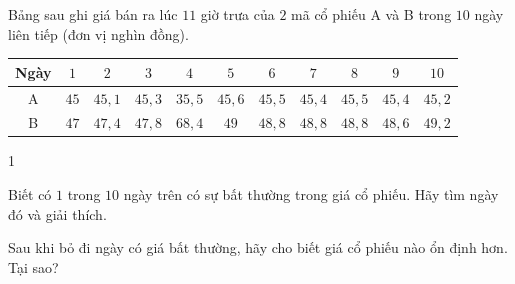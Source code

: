 \begin{bt}%
	Bảng sau ghi giá bán ra lúc $11$ giờ trưa của $2$ mã cổ phiếu A và B trong $10$ ngày liên tiếp (đơn vị nghìn đồng).
	\begin{center}
		\begin{tabular}{|c|c|c|c|c|c|c|c|c|c|c|}
			\hline Ngày & $1$ & $2$ & $3$ & $4$ & $5$ & $6$ & $7$ & $8$ & $9$ & $10$ \\
			\hline A & $45$ & $45{,}1$ & $45{,}3$ & $35{,}5 $& $45{,}6$ & $45{,}5$ & $45{,}4$ & $45{,}5$ & $45{,}4$ & $45{,}2$\\
			\hline B & $47$ & $47{,}4$ & $47{,}8$ & $68{,}4$ &$ 49$ & $48{,}8$ & $48{,}8 $& $48{,}8$ & $48{,}6$ & $49{,}2$ \\
			\hline
		\end{tabular}
	\end{center}
	\begin{enumEX}[a)]{1}
		\item Biết có $1$ trong $10$ ngày trên có sự bất thường trong giá cổ phiếu. Hãy tìm ngày đó và giải thích.
		\item Sau khi bỏ đi ngày có giá bất thường, hãy cho biết giá cổ phiếu nào ổn định hơn. Tại sao?
	\end{enumEX}
\end{bt}
